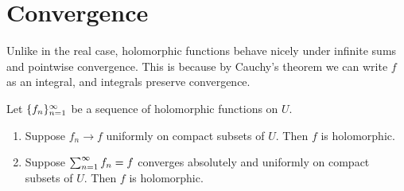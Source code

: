 \section{Convergence}
Unlike in the real case, holomorphic functions behave nicely under infinite sums and pointwise convergence. This is because by Cauchy's theorem we can write $f$ as an integral, and integrals preserve convergence.
\begin{thm}
Let $\{f_n\}_{n=1}^{\infty}$ be a sequence of holomorphic functions on $U$.
\begin{enumerate}
\item
 Suppose $f_n\to f$ uniformly on compact subsets of $U$. Then $f$ is holomorphic.
\item
Suppose $\sum_{n=1}^{\infty}f_n=f$ converges absolutely and uniformly on compact subsets of $U$. Then $f$ is holomorphic.
\end{enumerate}
\end{thm}
